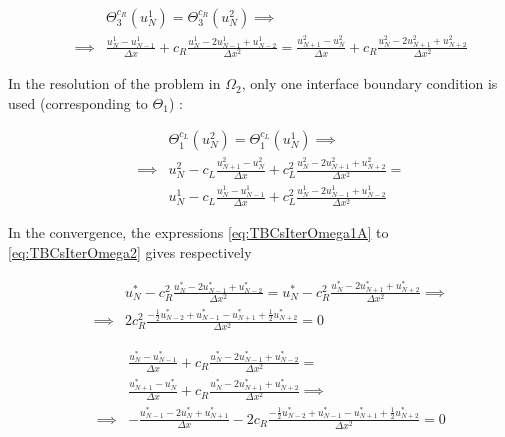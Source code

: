 \begin{equation}
	\begin{aligned}
    \label{eq:TBCsIterOmega1B}
    && 			   & \Theta_3^{c_R}(u_N^1) = \Theta_3^{c_R}(u_N^2) \implies \\
    && \implies & \frac{u_N^1 - u_{N-1}^1}{\Delta x} + c_R \frac{u_N^1 - 2u_{N-1}^1 + u_{N-2}^1}{\Delta x^2} = \frac{u_{N+1}^2 - u_{N}^2}{\Delta x} + c_R \frac{u_N^2 - 2u_{N+1}^2 + u_{N+2}^2}{\Delta x^2}
    \end{aligned}
\end{equation}

\indent In the resolution of the problem in $\Omega_2$, only one interface boundary condition is used (corresponding to $\Theta_1$) :

\begin{equation}
	\begin{aligned}
    \label{eq:TBCsIterOmega2}
    && 				&\Theta_1^{c_L}(u_N^2) = \Theta_1^{c_L}(u_N^1) \implies \\ 
    && \implies & u_N^2 - c_L \frac{u_{N+1}^2 - u_{N}^2}{\Delta x} + c_L^2 \frac{u_N^2 - 2u_{N+1}^2 + u_{N+2}^2}{\Delta x^2}  =\\
    && 				& u_N^1 - c_L \frac{u_{N}^1 - u_{N-1}^1}{\Delta x} + c_L^2 \frac{u_N^1 - 2u_{N-1}^1 + u_{N-2}^1}{\Delta x^2}
    \end{aligned}
\end{equation}

\indent In the convergence, the expressions \eqref{eq:TBCsIterOmega1A} to \eqref{eq:TBCsIterOmega2} gives respectively

\begin{equation}
    \label{eq:TBCsCVOmega1A}
\begin{aligned}
    && 			    &u_N^* - c_R^2 \frac{u_N^* - 2u_{N-1}^* + u_{N-2}^*}{\Delta x^2} = u_N^* - c_R^2 \frac{u_N^* - 2u_{N+1}^* + u_{N+2}^*}{\Delta x^2} \implies  \\
    && \implies & 2c_R^2 \frac{-\frac{1}{2}u_{N-2}^* + u_{N-1}^* - u_{N+1}^* + \frac{1}{2}u_{N+2}^* }{\Delta x^2} = 0
    \end{aligned}
    \end{equation}
    
\begin{equation}
    \label{eq:TBCsCVOmega1B}
\begin{aligned}
    &&             &\frac{u_N^* - u_{N-1}^*}{\Delta x} + c_R \frac{u_N^* - 2u_{N-1}^* + u_{N-2}^*}{\Delta x^2} = \\
    && 			   &\frac{u_{N+1}^* - u_{N}^*}{\Delta x} + c_R \frac{u_N^* - 2u_{N+1}^* + u_{N+2}^*}{\Delta x^2} \implies \\
    && \implies & -\frac{u_{N-1}^* - 2 u_{N}^* + u_{N+1}^*}{\Delta x} - 2c_R\frac{-\frac{1}{2}u_{N-2}^* + u_{N-1}^* - u_{N+1}^* + \frac{1}{2}u_{N+2}^* }{\Delta x^2} = 0 
\end{aligned}
\end{equation}

